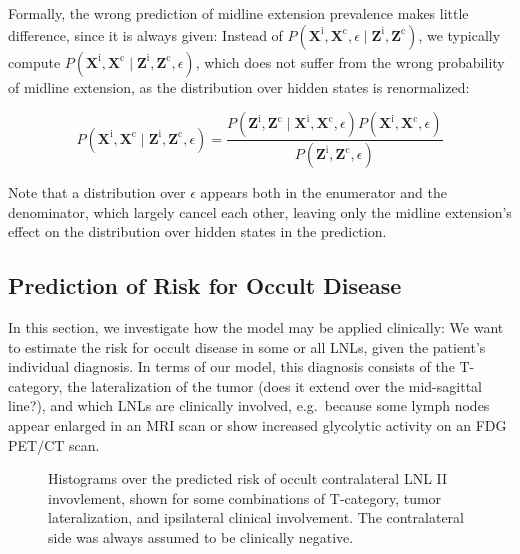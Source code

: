 \documentclass[
  sn-mathphys-num,
]{sn-jnl}
\begin{document}
Formally, the wrong prediction of midline extension prevalence makes
little difference, since it is always given: Instead of
\(P\left( \mathbf{X}^\text{i}, \mathbf{X}^\text{c}, \epsilon \mid \mathbf{Z}^\text{i}, \mathbf{Z}^\text{c} \right)\),
we typically compute
\(P\left( \mathbf{X}^\text{i}, \mathbf{X}^\text{c} \mid \mathbf{Z}^\text{i}, \mathbf{Z}^\text{c}, \epsilon \right)\),
which does not suffer from the wrong probability of midline extension,
as the distribution over hidden states is renormalized:

\[
P \left( \mathbf{X}^\text{i}, \mathbf{X}^\text{c} \mid \mathbf{Z}^\text{i}, \mathbf{Z}^\text{c}, \epsilon \right) = \frac{P \left( \mathbf{Z}^\text{i}, \mathbf{Z}^\text{c} \mid \mathbf{X}^\text{i}, \mathbf{X}^\text{c}, \epsilon \right) P \left( \mathbf{X}^\text{i}, \mathbf{X}^\text{c}, \epsilon \right)}{P \left( \mathbf{Z}^\text{i}, \mathbf{Z}^\text{c}, \epsilon \right)}
\]

Note that a distribution over \(\epsilon\) appears both in the
enumerator and the denominator, which largely cancel each other, leaving
only the midline extension's effect on the distribution over hidden
states in the prediction.

\subsection{Prediction of Risk for Occult
Disease}\label{prediction-of-risk-for-occult-disease}

In this section, we investigate how the model may be applied clinically:
We want to estimate the risk for occult disease in some or all LNLs,
given the patient's individual diagnosis. In terms of our model, this
diagnosis consists of the T-category, the lateralization of the tumor
(does it extend over the mid-sagittal line?), and which LNLs are
clinically involved, e.g.~because some lymph nodes appear enlarged in an
MRI scan or show increased glycolytic activity on an FDG PET/CT scan.

\begin{figure}


\caption{\label{fig-model-risks}Histograms over the predicted risk of
occult contralateral LNL II invovlement, shown for some combinations of
T-category, tumor lateralization, and ipsilateral clinical involvement.
The contralateral side was always assumed to be clinically negative.}

\end{figure}%
\end{document}
